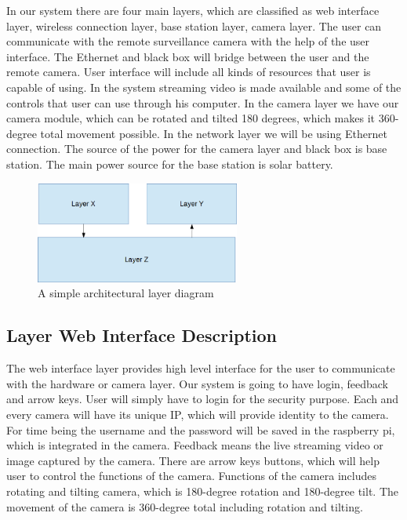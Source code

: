In our system there are four main layers, which are classified as web interface layer, wireless connection layer, base station layer, camera layer. The user can communicate with the remote surveillance camera with the help of the user interface. The Ethernet and black box will bridge between the user and the remote camera. User interface will include all kinds of resources that user is capable of using. In the system streaming video is made available and some of the controls that user can use through his computer. In the camera layer we have our camera module, which can be rotated and tilted 180 degrees, which makes it 360- degree total movement possible. In the network layer we will be using Ethernet connection. The source of the power for the camera layer and black box is base station. The main power source for the base station is solar battery.


\begin{figure}[h!]
	\centering
 	\includegraphics[width=0.60\textwidth]{images/layers}
 \caption{A simple architectural layer diagram}
\end{figure}

\subsection{Layer Web Interface Description}
The web interface layer provides high level interface for the user to communicate with the hardware or camera layer. Our system is going to have login, feedback and arrow keys. User will simply have to login for the security purpose. Each and every camera will have its unique IP, which will provide identity to the camera. For time being the username and the password will be saved in the raspberry pi, which is integrated in the camera. Feedback means the live streaming video or image captured by the camera. There are arrow keys buttons, which will help user to control the functions of the camera. Functions of the camera includes rotating and tilting camera, which is 180-degree rotation and 180-degree tilt. The movement of the camera is 360-degree total including rotation and tilting.

